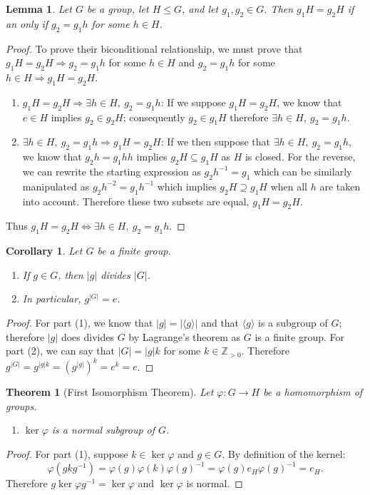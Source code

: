 \documentclass[12pt]{article}
\newcommand{\Z}{\mathbb{Z}}
\newtheorem{thm}{Theorem}
\newtheorem{lma}{Lemma}
\newtheorem{crlly}{Corollary}
\numberwithin{problem}{section} %
\numberwithin{defn}{section} %
\numberwithin{thm}{section} %
\numberwithin{exer}{section} %
\numberwithin{lma}{section} %
\numberwithin{crlly}{section} %
\theoremstyle{remark}  %
\begin{document}
\setcounter{lma}{26}
\begin{lma}
    Let $G$ be a group, let $H \leq G$, and let $g_1,g_2\in G$. Then $g_1H=g_2H$ if an only if $g_2=g_1h$ for some $h\in H$.
\end{lma}
\begin{proof}
    To prove their biconditional relationship, we must prove that $g_1H=g_2H\Rightarrow g_2=g_1h$ for some $h\in H$ and $g_2=g_1h$ for some $h\in H \Rightarrow g_1H=g_2H$.
    \begin{enumerate}
        \item \ul{$g_1H=g_2H \Rightarrow \exists h\in H,\ g_2=g_1h$}: If we suppose $g_1H=g_2H$, we know that $e\in H$ implies $g_2\in g_2H$; consequently $g_2\in g_1H$ therefore $\exists h\in H,\ g_2=g_1h$.
        \item \ul{$\exists h\in H,\ g_2=g_1h\Rightarrow g_1H=g_2H$}: If we then suppose that $\exists h\in H,\ g_2=g_1h$, we know that $g_2h=g_1hh$ implies $g_2H \subseteq g_1H$ as $H$ is closed. For the reverse, we can rewrite the starting expression as $g_2h^{-1}=g_1$ which can be similarly manipulated as $g_2h^{-2}=g_1h^{-1}$ which implies $g_2H \supseteq g_1 H$ when all $h$ are taken into account. Therefore these two subsets are equal, $g_1H=g_2H$.
    \end{enumerate}
    Thus $g_1H=g_2H \Leftrightarrow \exists h\in H,\ g_2=g_1h$.
\end{proof}

\setcounter{crlly}{28}
\begin{crlly}
    Let $G$ be a finite group.
    \begin{enumerate}
        \item If $g\in G$, then $|g|$ divides $|G|$.
        \item In particular, $g^{|G|}=e$.
    \end{enumerate}
\end{crlly}
\begin{proof}
    For part (1), we know that $|g|=|\langle g \rangle|$ and that $\langle g \rangle$ is a subgroup of $G$; therefore $|g|$ does divides $G$ by Lagrange's theorem as $G$ is a finite group. For part (2), we can say that $|G|=|g|k$ for some $k\in \Z_{>0}$. Therefore $g^{|G|}=g^{|g|k}=(g^{|g|})^k=e^k=e$.
\end{proof}

\setcounter{thm}{34}
\begin{thm}[First Isomorphism Theorem]
    Let $\varphi\operatorname{:}G\to H$ be a homomorphism of groups.
    \begin{enumerate}
        \item $\ker\varphi$ is a normal subgroup of $G$.
    \end{enumerate}
\end{thm}
\begin{proof}
    For part (1), suppose $k\in \ker \varphi$ and $g\in G$. By definition of the kernel: $$\varphi(gkg^{-1})=\varphi(g)\varphi(k)\varphi(g)^{-1}=\varphi(g)e_H\varphi(g)^{-1}=e_H.$$ Therefore $g\ker\varphi g^{-1}=\ker\varphi$ and $\ker\varphi$ is normal.   
\end{proof}
\end{document}
